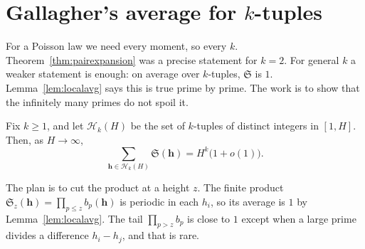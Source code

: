 \section{Gallagher's average for \texorpdfstring{$k$}{k}-tuples}\label{sec:gallagherk}

For a Poisson law we need every moment, so every $k$. Theorem~\ref{thm:pairexpansion} was a precise statement for $k=2$. For general $k$ a weaker statement is enough: on average over $k$-tuples, $\mathfrak S$ is $1$. Lemma~\ref{lem:localavg} says this is true prime by prime. The work is to show that the infinitely many primes do not spoil it.

\begin{theorem}[Gallagher, 1976]\label{thm:gallagherk}
Fix $k\ge1$, and let $\mathcal H_k(H)$ be the set of $k$-tuples of distinct integers in $[1,H]$. Then, as $H\to\infty$,
\[
\sum_{\mathbf h\in\mathcal H_k(H)}\mathfrak S(\mathbf h)=H^k\bigl(1+o(1)\bigr).
\]
\end{theorem}

The plan is to cut the product at a height $z$. The finite product $\mathfrak S_z(\mathbf h)=\prod_{p\le z}b_p(\mathbf h)$ is periodic in each $h_i$, so its average is $1$ by Lemma~\ref{lem:localavg}. The tail $\prod_{p>z}b_p$ is close to $1$ except when a large prime divides a difference $h_i-h_j$, and that is rare.

